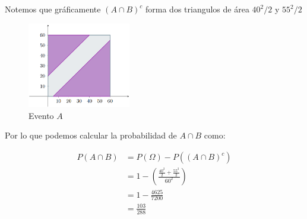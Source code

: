 \noindent Notemos que gráficamente $(A \cap B)^{c}$ forma dos triangulos de área $40^{2}/2$ y $55^{2}/2$

\begin{figure}[H] 
    \centering 
    \includegraphics[width=0.4\textwidth]{1 Introducción/1.1 Tipos de probabilidad/1.1 Imágenes/Probabilidad geometrica 6.png}
    \caption{Evento $A$}
\end{figure}

Por lo que podemos calcular la probabilidad de $A \cap B$ como:

\begin{equation*}
    \begin{split}
        P(A \cap B) & = P(\Omega) - P((A \cap B)^{c}) \\
        & = 1 - \left(\frac{\frac{40^{2}}{2}+\frac{55^{2}}{2}}{60^{2}}\right) \\
        & = 1- \frac{4625}{7200} \\
        & = \frac{103}{288}
    \end{split}
\end{equation*}
